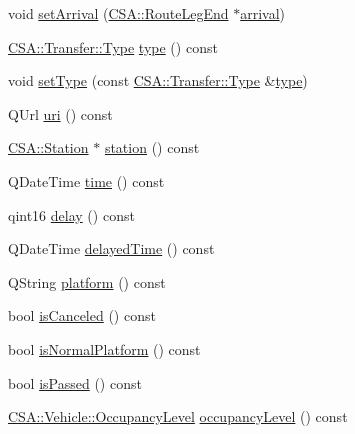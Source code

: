\begin{DoxyCompactItemize}
void \mbox{\hyperlink{classCSA_1_1Transfer_a0d139f6475fc5d791cf24e964777d9a5}{set\+Arrival}} (\mbox{\hyperlink{classCSA_1_1RouteLegEnd}{C\+S\+A\+::\+Route\+Leg\+End}} $\ast$\mbox{\hyperlink{classCSA_1_1Transfer_a1b651e08402cf33cf12d65ad9b6f8011}{arrival}})
\item 
\mbox{\hyperlink{classCSA_1_1Transfer_a827daaa28edc2c4b10ddfa70762355ea}{C\+S\+A\+::\+Transfer\+::\+Type}} \mbox{\hyperlink{classCSA_1_1Transfer_a52d56463fa87816353419a55cc3753de}{type}} () const
\item 
void \mbox{\hyperlink{classCSA_1_1Transfer_a56fb2f1effd38b42800ba341c15564a5}{set\+Type}} (const \mbox{\hyperlink{classCSA_1_1Transfer_a827daaa28edc2c4b10ddfa70762355ea}{C\+S\+A\+::\+Transfer\+::\+Type}} \&\mbox{\hyperlink{classCSA_1_1Transfer_a52d56463fa87816353419a55cc3753de}{type}})
\item 
Q\+Url \mbox{\hyperlink{classCSA_1_1Transfer_a0878390aa8e48d679b4ceae14cdfd6d7}{uri}} () const
\item 
\mbox{\hyperlink{classCSA_1_1Station}{C\+S\+A\+::\+Station}} $\ast$ \mbox{\hyperlink{classCSA_1_1Transfer_a345bb6fed54db1a5ed9ca8292ab4a57a}{station}} () const
\item 
Q\+Date\+Time \mbox{\hyperlink{classCSA_1_1Transfer_a260cf9330952c162d943d65deffcf5bc}{time}} () const
\item 
qint16 \mbox{\hyperlink{classCSA_1_1Transfer_af2447a3224c016dbb36905b87db0a31e}{delay}} () const
\item 
Q\+Date\+Time \mbox{\hyperlink{classCSA_1_1Transfer_acd43c880d4964a65cf148d0128a7224e}{delayed\+Time}} () const
\item 
Q\+String \mbox{\hyperlink{classCSA_1_1Transfer_a6b3d8d41cbe77793366243ac6902766f}{platform}} () const
\item 
bool \mbox{\hyperlink{classCSA_1_1Transfer_acd29a86e4dbb281ded35cb4e3f9f3000}{is\+Canceled}} () const
\item 
bool \mbox{\hyperlink{classCSA_1_1Transfer_a007baf97e02698d23c86b9c0a6b32350}{is\+Normal\+Platform}} () const
\item 
bool \mbox{\hyperlink{classCSA_1_1Transfer_a7ef5bea75d092ec379d21f5329766343}{is\+Passed}} () const
\item 
\mbox{\hyperlink{classCSA_1_1Vehicle_a331cc81107e5f0a8f37f894729dd9bda}{C\+S\+A\+::\+Vehicle\+::\+Occupancy\+Level}} \mbox{\hyperlink{classCSA_1_1Transfer_a7d5855f37a04c5e0dab60d87ef38f2ef}{occupancy\+Level}} () const
\end{DoxyCompactItemize}

